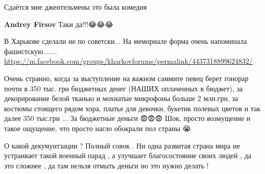 \begin{itemize}
 
Сдаётся мне джентельмены это была комедия 👏

\begin{itemize}
 
\textbf{Andrey Firsov} Таки да!!!😂😂😂
\end{itemize}

 
В Харькове сделали не по советски...
На мемориале форма очень напоминала фашистскую.......
\url{https://m.facebook.com/groups/kharkovforums/permalink/4437318899624832/}

 

Очень странно, когда за выступление на важном саммите певец берет гонорар почти
в 350 тыс. грн бюджетных денег (НАШИХ оплаченных в бюджет), за декорирование
белой тканью и мохнатые микрофоны больше 2 млн.грн, за костюмы стоящего рядом
хора, платье для девочки, букетик полевых цветов и так далее 350 тыс.грн ... За
бюджетные деньги 😨😨😨 Шок, просто возмущение и такое ощущение, что просто
нагло обокрали пол страны 😭


 

О какой декумунтзации ? Полный совок . Ни одна развитая страна мира не
устраивает такой военный парад , а улучшает благосостояние своих людей , да это
сложнее , да там нельзя отмыть деньги но это нужно делать !



\end{itemize}
